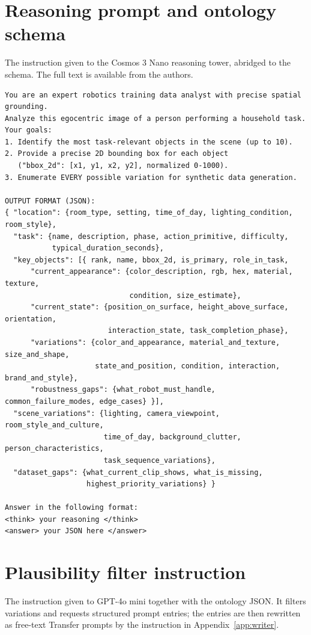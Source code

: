 \section{Reasoning prompt and ontology schema}
\label{app:prompt}
The instruction given to the Cosmos 3 Nano reasoning tower, abridged to the schema. The full text is available from the authors.

\begin{lstlisting}
You are an expert robotics training data analyst with precise spatial grounding.
Analyze this egocentric image of a person performing a household task.
Your goals:
1. Identify the most task-relevant objects in the scene (up to 10).
2. Provide a precise 2D bounding box for each object
   ("bbox_2d": [x1, y1, x2, y2], normalized 0-1000).
3. Enumerate EVERY possible variation for synthetic data generation.

OUTPUT FORMAT (JSON):
{ "location": {room_type, setting, time_of_day, lighting_condition, room_style},
  "task": {name, description, phase, action_primitive, difficulty,
           typical_duration_seconds},
  "key_objects": [{ rank, name, bbox_2d, is_primary, role_in_task,
      "current_appearance": {color_description, rgb, hex, material, texture,
                             condition, size_estimate},
      "current_state": {position_on_surface, height_above_surface, orientation,
                        interaction_state, task_completion_phase},
      "variations": {color_and_appearance, material_and_texture, size_and_shape,
                     state_and_position, condition, interaction, brand_and_style},
      "robustness_gaps": {what_robot_must_handle, common_failure_modes, edge_cases} }],
  "scene_variations": {lighting, camera_viewpoint, room_style_and_culture,
                       time_of_day, background_clutter, person_characteristics,
                       task_sequence_variations},
  "dataset_gaps": {what_current_clip_shows, what_is_missing,
                   highest_priority_variations} }

Answer in the following format:
<think> your reasoning </think>
<answer> your JSON here </answer>
\end{lstlisting}

\section{Plausibility filter instruction}
\label{app:filter}
The instruction given to GPT-4o mini together with the ontology JSON. It filters variations and requests structured prompt entries; the entries are then rewritten as free-text Transfer prompts by the instruction in Appendix~\ref{app:writer}.

